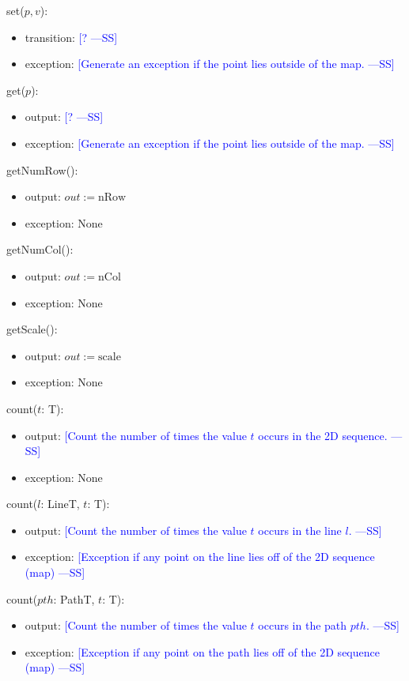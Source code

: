 \documentclass[12pt]{article}
\newcommand{\authornote}[3]{\textcolor{#1}{[#3 ---#2]}}
\newcommand{\authornote}[3]{}
\newcommand{\wss}[1]{\authornote{blue}{SS}{#1}}
\begin{document}
\noindent set($p, v$):
\begin{itemize}
\item transition: \wss{?}
\item exception: \wss{Generate an exception if the point lies outside of the
    map.}
\end{itemize}

\noindent get($p$):
\begin{itemize}
\item output: \wss{?}
\item exception: \wss{Generate an exception if the point lies outside of the
    map.}
\end{itemize}

\noindent getNumRow():
\begin{itemize}
\item output: $out := \mbox{nRow}$
\item exception: None
\end{itemize}

\noindent getNumCol():
\begin{itemize}
\item output: $out := \mbox{nCol}$
\item exception: None
\end{itemize}

\noindent getScale():
\begin{itemize}
\item output: $out := \mbox{scale}$
\item exception: None
\end{itemize}

\noindent count($t$: T):
\begin{itemize}
\item output: \wss{Count the number of times the value $t$ occurs in the 2D
    sequence.}
\item exception: None
\end{itemize}

\noindent count($l$: LineT, $t$: T):
\begin{itemize}
\item output: \wss{Count the number of times the value $t$ occurs in the line
    $l$.}
\item exception: \wss{Exception if any point on the line lies off of the 2D
    sequence (map)}
\end{itemize}

\noindent count($\mathit{pth}$: PathT, $t$: T):
\begin{itemize}
\item output: \wss{Count the number of times the value $t$ occurs in the path
    $pth$.}
\item exception: \wss{Exception if any point on the path lies off of the 2D
    sequence (map)}
\end{itemize}
\end{document}
